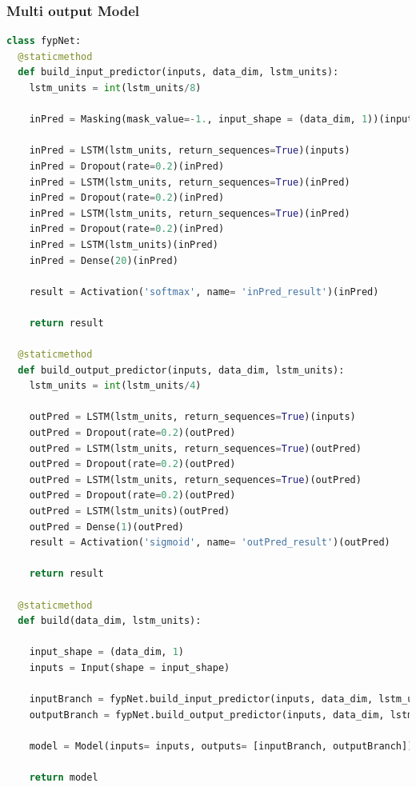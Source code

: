 \documentclass[10pt,onecolumn,letterpaper]{article}
\begin{document}
\subsubsection{Multi output Model}

\begin{lstlisting}[language=Python, breaklines=true, caption={Structuring of the multi output model, with two forks focused on the separate tasks of predicting the target variable, $y$ and the next input vector, $x_{t+1}$.}]
class fypNet: 
  @staticmethod
  def build_input_predictor(inputs, data_dim, lstm_units):
    lstm_units = int(lstm_units/8)

    inPred = Masking(mask_value=-1., input_shape = (data_dim, 1))(inputs)
    
    inPred = LSTM(lstm_units, return_sequences=True)(inputs)
    inPred = Dropout(rate=0.2)(inPred)
    inPred = LSTM(lstm_units, return_sequences=True)(inPred)
    inPred = Dropout(rate=0.2)(inPred)
    inPred = LSTM(lstm_units, return_sequences=True)(inPred)
    inPred = Dropout(rate=0.2)(inPred)
    inPred = LSTM(lstm_units)(inPred)    
    inPred = Dense(20)(inPred)
    
    result = Activation('softmax', name= 'inPred_result')(inPred)
    
    return result
    
  @staticmethod
  def build_output_predictor(inputs, data_dim, lstm_units): 
    lstm_units = int(lstm_units/4)
    
    outPred = LSTM(lstm_units, return_sequences=True)(inputs)
    outPred = Dropout(rate=0.2)(outPred)
    outPred = LSTM(lstm_units, return_sequences=True)(outPred)
    outPred = Dropout(rate=0.2)(outPred)
    outPred = LSTM(lstm_units, return_sequences=True)(outPred)
    outPred = Dropout(rate=0.2)(outPred)
    outPred = LSTM(lstm_units)(outPred)    
    outPred = Dense(1)(outPred)
    result = Activation('sigmoid', name= 'outPred_result')(outPred)
   
    return result
  
  @staticmethod
  def build(data_dim, lstm_units):
         
    input_shape = (data_dim, 1)
    inputs = Input(shape = input_shape)
   
    inputBranch = fypNet.build_input_predictor(inputs, data_dim, lstm_units)
    outputBranch = fypNet.build_output_predictor(inputs, data_dim, lstm_units)
    
    model = Model(inputs= inputs, outputs= [inputBranch, outputBranch])
    
    return model
\end{lstlisting} 
 
\end{document}
